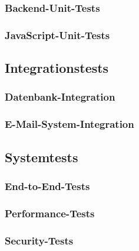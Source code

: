 \documentclass[11pt,a4paper]{article}
\begin{document}
\subsubsection{Backend-Unit-Tests}

\subsubsection{JavaScript-Unit-Tests}

\subsection{Integrationstests}

\subsubsection{Datenbank-Integration}

\subsubsection{E-Mail-System-Integration}

\subsection{Systemtests}

\subsubsection{End-to-End-Tests}

\subsubsection{Performance-Tests}

\subsubsection{Security-Tests}
\end{document}
